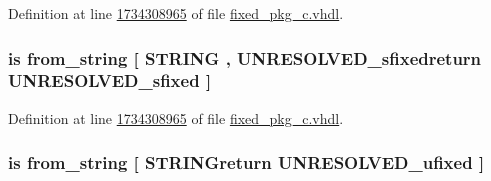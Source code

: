 Definition at line \hyperlink{fixed__pkg__c_8vhdl_source_l1734308965}{1734308965} of file \hyperlink{fixed__pkg__c_8vhdl_source}{fixed\+\_\+pkg\+\_\+c.\+vhdl}.

\hypertarget{classfixed__pkg_a580a78b7c4cd63422b9a571293d8e018}{}
\subsubsection[{from\+\_\+binary\+\_\+string}]{ {\bfseries \textcolor{keywordflow}{is}\textcolor{vhdlchar}{ }\textcolor{vhdlchar}{from\+\_\+string}\textcolor{vhdlchar}{ }\textcolor{vhdlchar}{\mbox{[}}\textcolor{vhdlchar}{ }\textcolor{comment}{S\+T\+R\+I\+N\+G}\textcolor{vhdlchar}{ }\textcolor{vhdlchar}{,}\textcolor{vhdlchar}{ }\textcolor{vhdlchar}{U\+N\+R\+E\+S\+O\+L\+V\+E\+D\+\_\+sfixedreturn}\textcolor{vhdlchar}{ }{\bfseries {\bf U\+N\+R\+E\+S\+O\+L\+V\+E\+D\+\_\+sfixed}} \textcolor{vhdlchar}{ }\textcolor{vhdlchar}{\mbox{]}}\textcolor{vhdlchar}{ }} \hspace{0.3cm}{\ttfamily [Alias]}}\label{classfixed__pkg_a580a78b7c4cd63422b9a571293d8e018}


Definition at line \hyperlink{fixed__pkg__c_8vhdl_source_l1734308965}{1734308965} of file \hyperlink{fixed__pkg__c_8vhdl_source}{fixed\+\_\+pkg\+\_\+c.\+vhdl}.

\hypertarget{classfixed__pkg_a8e105c4593830f93742f43539e13c450}{}
\subsubsection[{from\+\_\+binary\+\_\+string}]{ {\bfseries \textcolor{keywordflow}{is}\textcolor{vhdlchar}{ }\textcolor{vhdlchar}{from\+\_\+string}\textcolor{vhdlchar}{ }\textcolor{vhdlchar}{\mbox{[}}\textcolor{vhdlchar}{ }\textcolor{vhdlchar}{S\+T\+R\+I\+N\+Greturn}\textcolor{vhdlchar}{ }{\bfseries {\bf U\+N\+R\+E\+S\+O\+L\+V\+E\+D\+\_\+ufixed}} \textcolor{vhdlchar}{ }\textcolor{vhdlchar}{\mbox{]}}\textcolor{vhdlchar}{ }} \hspace{0.3cm}{\ttfamily [Alias]}}\label{classfixed__pkg_a8e105c4593830f93742f43539e13c450}


